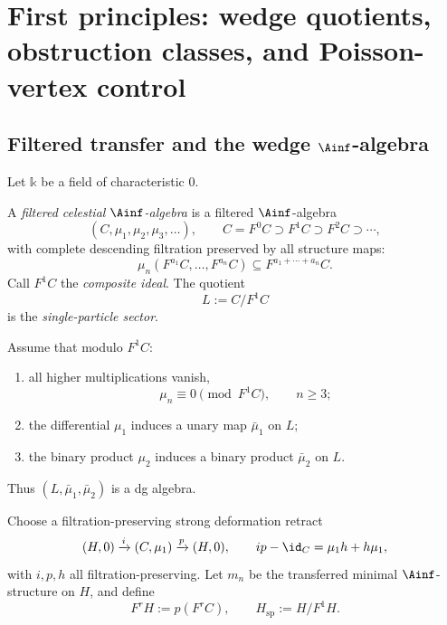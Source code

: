 \section{First principles: wedge quotients, obstruction classes, and Poisson-vertex control}
\label{sec:cbt-first-principles}

\subsection{Filtered transfer and the wedge $\Ainf$-algebra}
\label{sec:cbt-filtered-transfer}

Let $\mathbb{k}$ be a field of characteristic $0$.

\begin{definition}
\label{def:cbt-filtered-celestial}
A \emph{filtered celestial $\Ainf$-algebra} is a filtered $\Ainf$-algebra
\[
(C,\mu_1,\mu_2,\mu_3,\ldots),
\qquad
C=F^0C\supset F^1C\supset F^2C\supset \cdots,
\]
with complete descending filtration preserved by all structure maps:
\[
\mu_n(F^{a_1}C,\dots,F^{a_n}C)\subseteq F^{a_1+\cdots+a_n}C.
\]
Call $F^1C$ the \emph{composite ideal}. The quotient
\[
L:=C/F^1C
\]
is the \emph{single-particle sector}.
\end{definition}

Assume that modulo $F^1C$:
\begin{enumerate}[label=\textup{(\roman*)},leftmargin=2em]
\item all higher multiplications vanish,
\[
\mu_n\equiv 0 \pmod{F^1C},
\qquad n\geq 3;
\]
\item the differential $\mu_1$ induces a unary map $\bar\mu_1$ on $L$;
\item the binary product $\mu_2$ induces a binary product $\bar\mu_2$ on $L$.
\end{enumerate}
Thus $(L,\bar\mu_1,\bar\mu_2)$ is a dg algebra.

Choose a filtration-preserving strong deformation retract
\[
(H,0)\xrightarrow{i}(C,\mu_1)\xrightarrow{p}(H,0),
\qquad
ip-\id_C=\mu_1 h+h\mu_1,
\]
with $i,p,h$ all filtration-preserving. Let $m_n$ be the transferred minimal $\Ainf$-structure on $H$, and define
\[
F^rH:=p(F^rC),
\qquad
H_{\mathrm{sp}}:=H/F^1H.
\]

